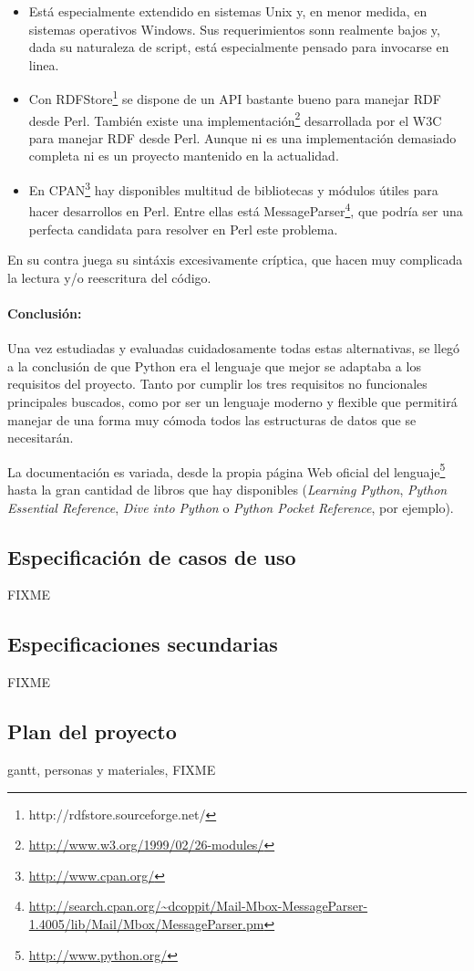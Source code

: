 \begin{itemize}
  \item Está especialmente extendido en sistemas Unix y, en menor medida, en sistemas
	operativos Windows. Sus requerimientos sonn realmente bajos y, dada su naturaleza
	de script, está especialmente pensado para invocarse en linea.
  \item Con RDFStore\footnote{http://rdfstore.sourceforge.net/} se dispone de un API bastante
	bueno para manejar RDF desde Perl. También existe una
	implementación\footnote{\url{http://www.w3.org/1999/02/26-modules/}} 
	desarrollada por el W3C para manejar RDF desde Perl. Aunque ni es una implementación
	demasiado completa ni es un proyecto mantenido en la actualidad.
  \item En CPAN\footnote{\url{http://www.cpan.org/}} hay disponibles multitud de bibliotecas
	y módulos útiles para hacer desarrollos en Perl. Entre ellas está
	MessageParser\footnote{\url{http://search.cpan.org/~dcoppit/Mail-Mbox-MessageParser-1.4005/lib/Mail/Mbox/MessageParser.pm}},
	que podría ser una perfecta candidata para resolver en Perl este problema.
\end{itemize}

En su contra juega su sintáxis excesivamente críptica, que hacen muy complicada
la lectura y/o reescritura del código.

\newpage

\paragraph{Conclusión:} Una vez estudiadas y evaluadas cuidadosamente todas estas 
alternativas, se llegó a la conclusión de que Python era el lenguaje que mejor se 
adaptaba a los requisitos del proyecto. Tanto por cumplir los tres requisitos 
no funcionales principales buscados, como por ser un lenguaje moderno y flexible 
que permitirá manejar de una forma muy cómoda todos las estructuras de datos que se
necesitarán.

La documentación es variada, desde la propia página Web oficial del 
lenguaje\footnote{\url{http://www.python.org/}} hasta la gran cantidad de libros
que hay disponibles (\emph{Learning Python}\cite{LearningPython},
\emph{Python Essential Reference}\cite{PythonEssential}, 
\emph{Dive into Python}\cite{DivePython} o \emph{Python Pocket Reference}\cite{PythonPocket},
por ejemplo).

\subsection{Especificación de casos de uso}

FIXME

\subsection{Especificaciones secundarias}

FIXME

\subsection{Plan del proyecto}

gantt, personas y materiales, FIXME
